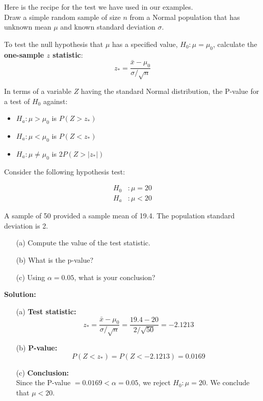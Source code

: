 \begin{tcolorbox}[title=\textbf{Z Test for a Population Mean $\mu$},
  colback=yellow!10,
  colframe=black!45,
  coltitle=black,
  fonttitle=\bfseries,
  breakable]

Here is the recipe for the test we have used in our examples.\\
Draw a simple random sample of size $n$ from a Normal population that has unknown mean $\mu$ and known standard deviation $\sigma$.

To test the null hypothesis that $\mu$ has a specified value, $H_0 : \mu = \mu_0$, calculate the \textbf{one-sample $z$ statistic}:
\[
z_\ast = \frac{\bar{x} - \mu_0}{\sigma / \sqrt{n}}
\]

In terms of a variable $Z$ having the standard Normal distribution, the P-value for a test of $H_0$ against:
\begin{itemize}
  \item $H_a: \mu > \mu_0$ is $P(Z > z_\ast)$
  \item $H_a: \mu < \mu_0$ is $P(Z < z_\ast)$
  \item $H_a: \mu \ne \mu_0$ is $2P(Z > |z_\ast|)$
\end{itemize}

\end{tcolorbox}
\begin{example}

Consider the following hypothesis test:

\begin{align*}
H_0 &: \mu = 20 \\
H_a &: \mu < 20
\end{align*}


A sample of 50 provided a sample mean of 19.4. The population standard deviation is 2.

\begin{enumerate}
    \item[(a)] Compute the value of the test statistic.
    \item[(b)] What is the p-value?
    \item[(c)] Using $\alpha = 0.05$, what is your conclusion?
\end{enumerate}

\textbf{Solution:}

\begin{enumerate}
    \item[(a)] \textbf{Test statistic:}
    \[
    z_\ast = \frac{\bar{x} - \mu_0}{\sigma / \sqrt{n}} = \frac{19.4 - 20}{2 / \sqrt{50}} = -2.1213
    \]
    
    \item[(b)] \textbf{P-value:}
    \[
    P(Z < z_\ast) = P(Z < -2.1213) = 0.0169
    \]

    \item[(c)] \textbf{Conclusion:} \\
    Since the P-value $= 0.0169 < \alpha = 0.05$, we reject $H_0 : \mu = 20$. We conclude that $\mu < 20$.
\end{enumerate}

\end{example}
